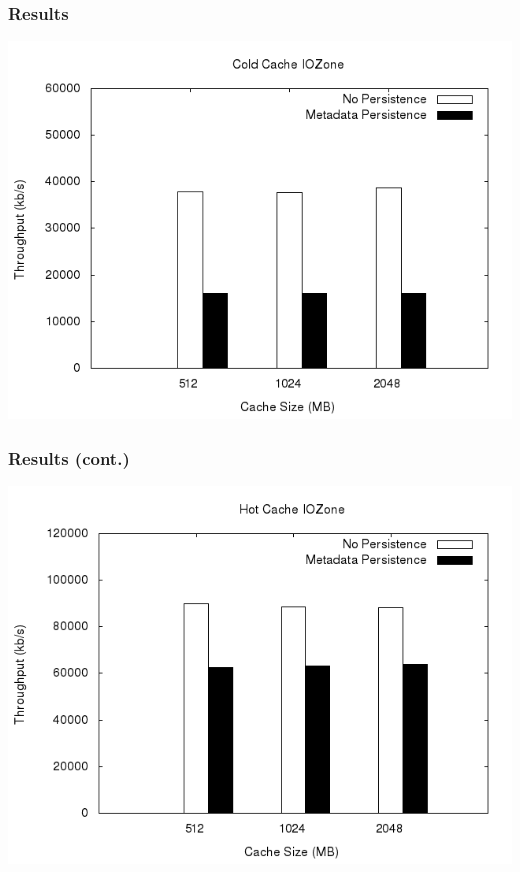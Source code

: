 \documentclass{beamer}
\begin{document}
\begin{frame}
  \frametitle{Results}
  
  \begin{center}
    \includegraphics[scale=0.35]{results_first.png}
  \end{center}

\end{frame}

\begin{frame}
  \frametitle{Results (cont.)}

  \begin{center}
    \includegraphics[scale=0.35]{results_second.png}
  \end{center}
  
\end{frame}
\end{document}
